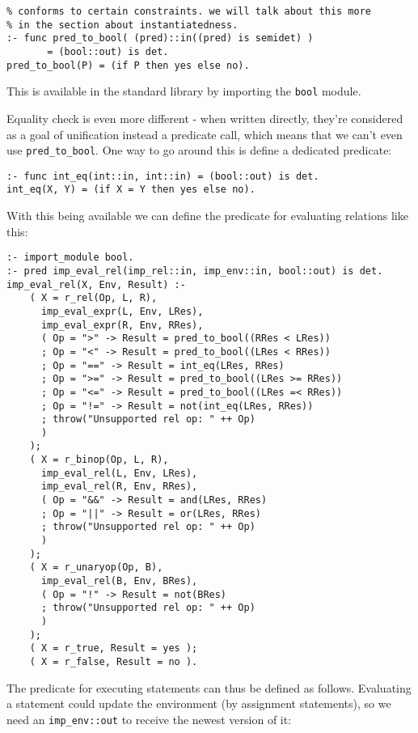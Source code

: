 \begin{lstlisting}[language=Mercury]
% the instantiatedness here restricts its argument to those that
% conforms to certain constraints. we will talk about this more
% in the section about instantiatedness.
:- func pred_to_bool( (pred)::in((pred) is semidet) )
       = (bool::out) is det.
pred_to_bool(P) = (if P then yes else no).
\end{lstlisting}

This is available in the standard library by importing the \texttt{bool} module.

Equality check is even more different - when written directly, they're considered as a goal of unification instead a predicate call, which means that we can't even use \texttt{pred_to_bool}. One way to go around this is define a dedicated predicate:

\begin{lstlisting}[language=Mercury]
:- func int_eq(int::in, int::in) = (bool::out) is det.
int_eq(X, Y) = (if X = Y then yes else no).
\end{lstlisting}

With this being available we can define the predicate for evaluating relations like this:

\begin{lstlisting}[language=Mercury]
:- import_module bool.
:- pred imp_eval_rel(imp_rel::in, imp_env::in, bool::out) is det.
imp_eval_rel(X, Env, Result) :-
	( X = r_rel(Op, L, R),
	  imp_eval_expr(L, Env, LRes),
	  imp_eval_expr(R, Env, RRes),
	  ( Op = ">" -> Result = pred_to_bool((RRes < LRes))
	  ; Op = "<" -> Result = pred_to_bool((LRes < RRes))
	  ; Op = "==" -> Result = int_eq(LRes, RRes)
	  ; Op = ">=" -> Result = pred_to_bool((LRes >= RRes))
	  ; Op = "<=" -> Result = pred_to_bool((LRes =< RRes))
	  ; Op = "!=" -> Result = not(int_eq(LRes, RRes))
	  ; throw("Unsupported rel op: " ++ Op)
	  )
	);
	( X = r_binop(Op, L, R),
	  imp_eval_rel(L, Env, LRes),
	  imp_eval_rel(R, Env, RRes),
	  ( Op = "&&" -> Result = and(LRes, RRes)
	  ; Op = "||" -> Result = or(LRes, RRes)
	  ; throw("Unsupported rel op: " ++ Op)
	  )
	);
	( X = r_unaryop(Op, B),
	  imp_eval_rel(B, Env, BRes),
	  ( Op = "!" -> Result = not(BRes)
	  ; throw("Unsupported rel op: " ++ Op)
	  )
	);
	( X = r_true, Result = yes );
	( X = r_false, Result = no ).
\end{lstlisting}

The predicate for executing statements can thus be defined as follows. Evaluating a statement could update the environment (by assignment statements), so we need an \texttt{imp_env::out} to receive the newest version of it:

